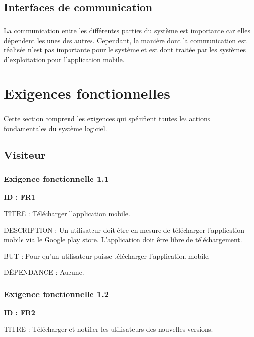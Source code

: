 \documentclass[titlepage, 12pt]{report}
\begin{document}
\section{Interfaces de communication}

\paragraph{}La communication entre les différentes parties du système est importante car elles dépendent les unes des autres. Cependant, la manière dont la communication est réalisée n'est pas importante pour le système et est dont traitée par les systèmes d'exploitation pour l'application mobile.

\chapter{Exigences fonctionnelles}

\paragraph{}Cette section comprend les exigences qui spécifient toutes les actions fondamentales du système logiciel.

\section{Visiteur}

\subsection{Exigence fonctionnelle 1.1}

\textbf{ID : FR1}

TITRE : Télécharger l'application mobile.

DESCRIPTION : Un utilisateur doit être en mesure de télécharger l'application mobile via le Google play store. L'application doit être libre de téléchargement.

BUT : Pour qu'un utilisateur puisse télécharger l'application mobile.

DÉPENDANCE : Aucune.

\subsection{Exigence fonctionnelle 1.2}

\textbf{ID : FR2}

TITRE : Télécharger et notifier les utilisateurs des nouvelles versions.
\end{document}
